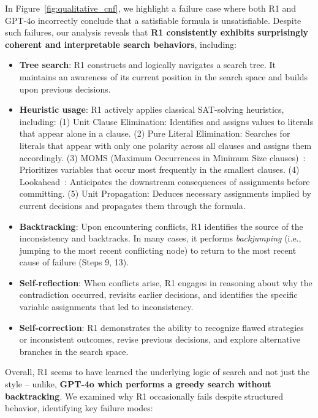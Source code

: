 \documentclass{article} %
\begin{document}
In Figure~\ref{fig:qualitative_cnf}, we highlight a failure case where both R1 and GPT-4o incorrectly conclude that a satisfiable formula is unsatisfiable. Despite such failures, our analysis reveals that \textbf{R1 consistently exhibits surprisingly coherent and interpretable search behaviors}, including:


\begin{itemize}[leftmargin=*, noitemsep, topsep=0pt]
    \item \textbf{Tree search}: R1 constructs and logically navigates a search tree. It maintains an awareness of its current position in the search space and builds upon previous decisions.
    \item \textbf{Heuristic usage}: R1 actively applies classical SAT-solving heuristics, including: (1) Unit Clause Elimination: Identifies and assigns values to literals that appear alone in a clause. (2) Pure Literal Elimination: Searches for literals that appear with only one polarity across all clauses and assigns them accordingly. (3) MOMS (Maximum Occurrences in Minimum Size clauses)~\citep{crawford1996experimental,hooker1995branching}: Prioritizes variables that occur most frequently in the smallest clauses. (4) Lookahead~\citep{lookahead_cdcl,lookahead_heuristics}: Anticipates the downstream consequences of assignments before committing. (5) Unit Propagation: Deduces necessary assignments implied by current decisions and propagates them through the formula.
    \item \textbf{Backtracking}: Upon encountering conflicts, R1 identifies the source of the inconsistency and backtracks. In many cases, it performs \emph{backjumping} (i.e., jumping to the most recent conflicting node) to return to the most recent cause of failure (Steps 9, 13).
    \item \textbf{Self-reflection}: When conflicts arise, R1 engages in reasoning about why the contradiction occurred, revisits earlier decisions, and identifies the specific variable assignments that led to inconsistency. 
    \item \textbf{Self-correction}: R1 demonstrates the ability to recognize flawed strategies or inconsistent outcomes, revise previous decisions, and explore alternative branches in the search space.
\end{itemize}


Overall, R1 seems to have learned the underlying logic of search and not just the style -- unlike, \textbf{GPT-4o which performs a greedy search without backtracking}. We examined why R1 occasionally fails despite structured behavior, identifying key failure modes:
\end{document}
